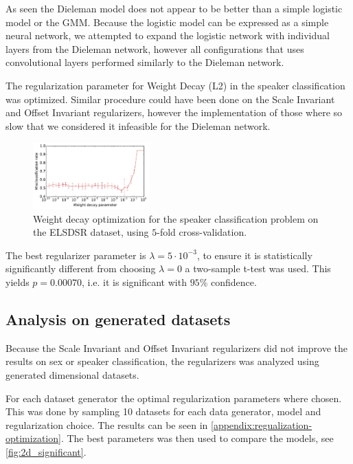 As seen the Dieleman model does not appear to be better than a simple logistic model or the GMM. Because the logistic model can be expressed as a simple neural network, we attempted to expand the logistic network with individual layers from the Dieleman network, however all configurations that uses convolutional layers performed similarly to the Dieleman network.

The regularization parameter for Weight Decay (L2) in the speaker classification was optimized. Similar procedure could have been done on the Scale Invariant and Offset Invariant regularizers, however the implementation of those where so slow that we considered it infeasible for the Dieleman network.

\begin{figure}[H]
  \centering
  \includegraphics[width=0.4\textwidth]{plots/reg_opt_dieleman_speaker_elsdsr}
  \caption{Weight decay optimization for the speaker classification problem on the ELSDSR dataset, using $5$-fold cross-validation.}
  \label{fig:reg_opt}
\end{figure}

The best regularizer parameter is $\lambda = 5 \cdot 10^{-3}$, to ensure it is statistically significantly different from choosing $\lambda = 0$ a two-sample t-test was used. This yields $p = 0.00070$, i.e. it is significant with $95\%$ confidence.

\subsection{Analysis on generated datasets}

Because the Scale Invariant and Offset Invariant regularizers did not improve the results on sex or speaker classification, the regularizers was analyzed using generated dimensional datasets.


For each dataset generator the optimal regularization parameters where chosen. This was done by sampling 10 datasets for each data generator, model and regularization choice. The results can be seen in \cref{appendix:regualization-optimization}. The best parameters was then used to compare the models, see \cref{fig:2d_significant}.

